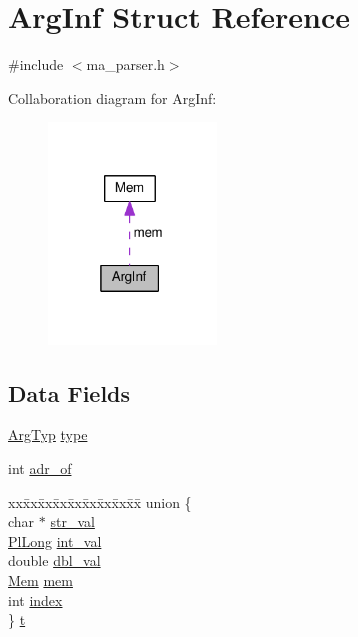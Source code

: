\hypertarget{structArgInf}{}\section{Arg\+Inf Struct Reference}
\label{structArgInf}


{\ttfamily \#include $<$ma\+\_\+parser.\+h$>$}



Collaboration diagram for Arg\+Inf\+:\nopagebreak
\begin{figure}[H]
\begin{center}
\leavevmode
\includegraphics[width=127pt]{structArgInf__coll__graph}
\end{center}
\end{figure}
\subsection*{Data Fields}
\begin{DoxyCompactItemize}
\item 
\hyperlink{ma__parser_8h_a55e83ab108ec469cbb59876c09f146b0}{Arg\+Typ} \hyperlink{structArgInf_ad416abaf87d2e52a23c4d2eb517919e4}{type}
\item 
int \hyperlink{structArgInf_a9a45faac36b5ff6b969faa85446f40e1}{adr\+\_\+of}
\item 
\begin{tabbing}
xx\=xx\=xx\=xx\=xx\=xx\=xx\=xx\=xx\=\kill
union \{\\
\>char $\ast$ \hyperlink{structArgInf_aae189057e919a389c59d0ee897884c5f}{str\_val}\\
\>\hyperlink{gprolog_8h_a4d005b136d7fb28537eb1815f7868b63}{PlLong} \hyperlink{structArgInf_a9b94d186b491b4009a1905f86e41ad9c}{int\_val}\\
\>double \hyperlink{structArgInf_a5ce0eda4a228042bd33b247f80e61144}{dbl\_val}\\
\>\hyperlink{structMem}{Mem} \hyperlink{structArgInf_aa4a2dcaf59861c10d3622f1bdcc5ac3d}{mem}\\
\>int \hyperlink{structArgInf_a053ccdce92762ff8fecd64a3ce561aea}{index}\\
\} \hyperlink{structArgInf_ae7f40cf76bee98b10f0eb3d865b2b912}{t}\\

\end{tabbing}\end{DoxyCompactItemize}


